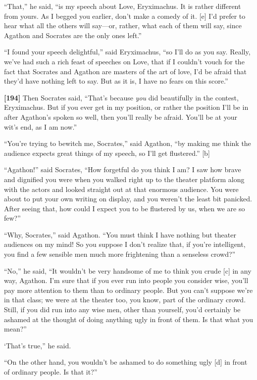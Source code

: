 “That,” he said, “is my speech about Love, Eryximachus. It is rather
different from yours. As I begged you earlier, don't make a comedy of
it. {[}e{]} I'd prefer to hear what all the others will say---or,
rather, what each of them will say, since Agathon and Socrates are the
only ones left.”

“I found your speech delightful,” said Eryximachus, “so I'll do as you
say. Really, we've had such a rich feast of speeches on Love, that if I
couldn't vouch for the fact that Socrates and Agathon are masters of the
art of love, I'd be afraid that they'd have nothing left to say. But as
it is, I have no fears on this score.”

{\bf {[}194{]}} Then Socrates said, “That's because {\em you} did
beautifully in the contest, Eryximachus. But if you ever get in my
position, or rather the position I'll be in after Agathon's spoken so
well, then you'll really be afraid. You'll be at your wit's end, as I am
now.”

“You're trying to bewitch me, Socrates,” said Agathon, “by making me
think the audience expects great things of my speech, so I'll get
flustered.” {[}b{]}

“Agathon!” said Socrates, “How forgetful do you think I am? I saw how
brave and dignified you were when you walked right up to the theater
platform along with the actors and looked straight out at that enormous
audience. You were about to put your own writing on display, and you
weren't the least bit panicked. After seeing that, how could I expect
you to be flustered by us, when we are so few?”

“Why, Socrates,” said Agathon. “You must think I have nothing but
theater audiences on my mind! So you suppose I don't realize that, if
you're intelligent, you find a few sensible men much more frightening
than a senseless crowd?”

“No,” he said, “It wouldn't be very handsome of me to think you crude
{[}c{]} in any way, Agathon. I'm sure that if you ever run into people
you consider wise, you'll pay more attention to them than to ordinary
people. But you can't suppose we're in that class; we were at the
theater too, you know, part of the ordinary crowd. Still, if you did run
into any wise men, other than yourself, you'd certainly be ashamed at
the thought of doing anything ugly in front of them. Is that what you
mean?”

‘That's true,” he said.

“On the other hand, you wouldn't be ashamed to do something ugly {[}d{]}
in front of ordinary people. Is that it?”

